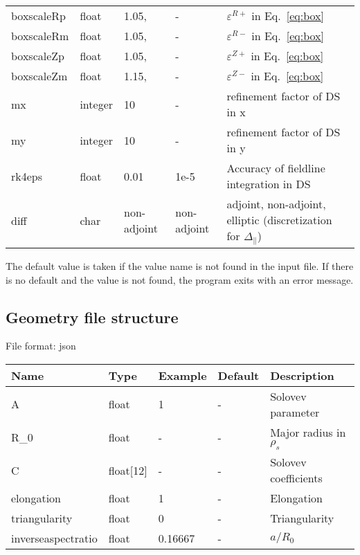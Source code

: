 \begin{longtable}{llll>{\RaggedRight}p{7cm}}
  boxscaleRp & float &  1.05, & - & $\varepsilon^{R+}$ in Eq.~\eqref{eq:box} \\
  boxscaleRm & float &  1.05, & - & $\varepsilon^{R-}$ in Eq.~\eqref{eq:box} \\
  boxscaleZp & float &  1.05, & - & $\varepsilon^{Z+}$ in Eq.~\eqref{eq:box} \\
  boxscaleZm & float &  1.15, & - & $\varepsilon^{Z-}$ in Eq.~\eqref{eq:box} \\
  mx     & integer & 10 & - & refinement factor of DS in x \\
  my     & integer & 10 & - & refinement factor of DS in y \\
  rk4eps & float & 0.01 & 1e-5 & Accuracy of fieldline integration in DS \\
  diff       & char & non-adjoint & non-adjoint & adjoint, non-adjoint, elliptic (discretization for $\Delta_\parallel$) \\
\bottomrule
\end{longtable}

The default value is taken if the value name is not found in the input file. If there is no default and
the value is not found,
the program exits with an error message.

\subsection{Geometry file structure}
File format: json

\begin{longtable}{llll>{\RaggedRight}p{7cm}}
\toprule
\rowcolor{gray!50}\textbf{Name} &  \textbf{Type} & \textbf{Example} & \textbf{Default} & \textbf{Description}  \\ \midrule
    A      & float & 1 &  - & Solovev parameter \\
    R\_0   & float & - & -  & Major radius in $\rho_s$ \\
    C      & float[12] &  - & - & Solovev coefficients \\
    elongation & float & 1 & - & Elongation \\
    triangularity & float & 0 & - & Triangularity \\
    inverseaspectratio & float & 0.16667 & - & $a/R_0$ \\
\bottomrule
\end{longtable}

